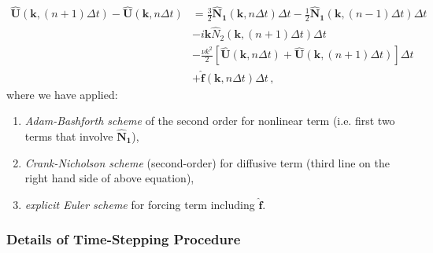 \documentclass{pracamgren}
\begin{document}
\begin{enumerate}
\begin{align}
\mathbf{\hat{U}}(\mathbf{k}, (n+1) \Delta t) - \mathbf{\hat{U}}(\mathbf{k}, n \Delta t)
&= \frac{3}{2} \mathbf{\hat{N}_1}(\mathbf{k}, n \Delta t) \Delta t - \frac{1}{2} \mathbf{\hat{N}_1}(\mathbf{k}, (n-1) \Delta t) \Delta t \\
&- i \mathbf{k} \hat{N}_2 (\mathbf{k}, (n+1) \Delta t) \Delta t \\
&- \frac{\nu k^2}{2} \left[ \mathbf{\hat{U}}(\mathbf{k}, n \Delta t) + \mathbf{\hat{U}}(\mathbf{k}, (n+1) \Delta t) \right] \Delta t \\
&+ \mathbf{\hat{f}}(\mathbf{k}, n \Delta t) \Delta t \, ,
\label{eqn:psproc-4}
\end{align}
where we have applied: 
\begin{enumerate}
\item \emph{Adam-Bashforth scheme} of the second order for  nonlinear term (i.e. first two terms that involve $\mathbf{\hat{N}_1}$),
\item \emph{Crank-Nicholson scheme} (second-order) for diffusive term (third line on the right hand side of above equation),
\item \emph{explicit Euler scheme} for forcing term including $\mathbf{\hat{f}}$.
\end{enumerate}
\end{enumerate}

\subsubsection{Details of Time-Stepping Procedure}
\end{document}
